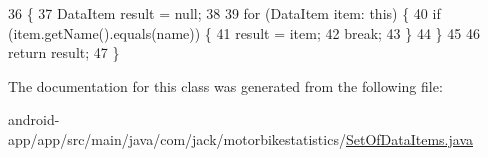 \begin{DoxyCode}
36                                                \{
37         DataItem result = null;
38 
39         \textcolor{keywordflow}{for} (DataItem item: \textcolor{keyword}{this}) \{
40             \textcolor{keywordflow}{if} (item.getName().equals(name)) \{
41                 result = item;
42                 \textcolor{keywordflow}{break};
43             \}
44         \}
45 
46         \textcolor{keywordflow}{return} result;
47     \}
\end{DoxyCode}


The documentation for this class was generated from the following file\+:\begin{DoxyCompactItemize}
\item 
android-\/app/app/src/main/java/com/jack/motorbikestatistics/\hyperlink{_set_of_data_items_8java}{Set\+Of\+Data\+Items.\+java}\end{DoxyCompactItemize}
